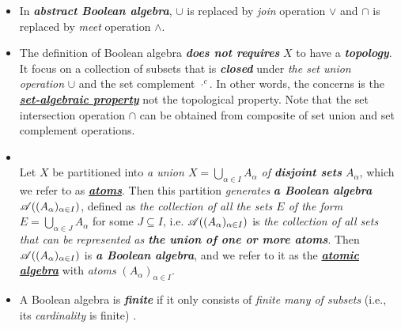 \documentclass[11pt]{article}
\begin{document}
\begin{itemize}
\item \begin{remark}
In \emph{\textbf{abstract Boolean algebra}}, $\cup$ is replaced by \emph{join} operation $\lor$ and $\cap$ is replaced by \emph{meet} operation $\land$.
\end{remark}

\item \begin{remark}
The definition of Boolean algebra \emph{\textbf{does not requires}} $X$ to have a \emph{\textbf{topology}}. It focus on a collection of subsets that is \emph{\textbf{closed}} under \emph{the set union operation} $\cup$ and the set complement $\cdot^c$. In other words, the concerns is the \underline{\emph{\textbf{set-algebraic property}}} not the topological property. Note that the set intersection operation $\cap$ can be obtained from composite of set union and set complement operations.
\end{remark}

\item 
\begin{definition} \citep{tao2011introduction}\\
Let $X$ be partitioned into \emph{a union $X= \bigcup_{\alpha\in I}A_{\alpha}$ of \emph{\textbf{disjoint sets}} $A_{\alpha}$}, which we refer to as \underline{\emph{\textbf{atoms}}}. Then this partition \emph{generates} \emph{\textbf{a Boolean algebra}} ${\mathscr A}((A_{\alpha})_{\alpha\in I} )$, defined as \emph{the collection of all the sets $E$ of the form $E =\bigcup_{\alpha\in J}A_{\alpha}$} for some $J \subseteq I$, i.e. ${\mathscr A}((A_{\alpha})_{\alpha\in I} )$ is \emph{the collection of all sets that can be represented as \textbf{the union of one or more atoms}}. Then ${\mathscr A}((A_{\alpha})_{\alpha\in I} )$ is \emph{\textbf{a Boolean algebra}}, and we refer to it as the \underline{\emph{\textbf{atomic algebra}}} with \emph{atoms} $(A_{\alpha})_{\alpha\in I}$.
\end{definition}

\item \begin{definition}
A Boolean algebra is \emph{\textbf{finite}} if it only consists of \emph{finite many of subsets} (i.e., its \emph{cardinality} is finite)  \citep{tao2011introduction}.  
\end{definition}


\end{itemize}
\end{document}
